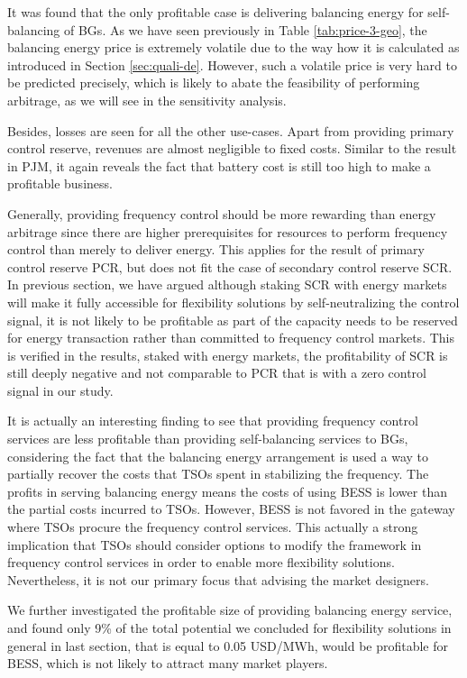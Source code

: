 It was found that the only profitable case is delivering balancing energy for self-balancing of BGs. As we have seen previously in Table \ref{tab:price-3-geo}, the balancing energy price is extremely volatile due to the way how it is calculated as introduced in Section \ref{sec:quali-de}. However, such a volatile price is very hard to be predicted precisely, which is likely to abate the feasibility of performing arbitrage, as we will see in the sensitivity analysis. 

Besides, losses are seen for all the other use-cases. Apart from providing primary control reserve, revenues are almost negligible to fixed costs. Similar to the result in PJM, it again reveals the fact that battery cost is still too high to make a profitable business. 

Generally, providing frequency control should be more rewarding than energy arbitrage since there are higher prerequisites for resources to perform frequency control than merely to deliver energy. This applies for the result of primary control reserve PCR, but does not fit the case of secondary control reserve SCR. In previous section, we have argued although staking SCR with energy markets will make it fully accessible for flexibility solutions by self-neutralizing the control signal, it is not likely to be profitable as part of the capacity needs to be reserved for energy transaction rather than committed to frequency control markets. This is verified in the results, staked with energy markets, the profitability of SCR is still deeply negative and not comparable to PCR that is with a zero control signal in our study.

It is actually an interesting finding to see that providing frequency control services are less profitable than providing self-balancing services to BGs, considering the fact that the balancing energy arrangement is used a way to partially recover the costs that TSOs spent in stabilizing the frequency. The profits in serving balancing energy means the costs of using BESS is lower than the partial costs incurred to TSOs. However, BESS is not favored in the gateway where TSOs procure the frequency control services. This actually a strong implication that TSOs should consider options to modify the framework in frequency control services in order to enable more flexibility solutions. Nevertheless, it is not our primary focus that advising the market designers.

We further investigated the profitable size of providing balancing energy service, and found only 9\% of the total potential we concluded for flexibility solutions in general in last section, that is equal to 0.05 USD/MWh, would be profitable for BESS, which is not likely to attract many market players.


